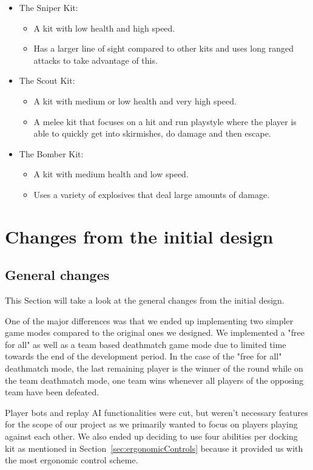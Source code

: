 \begin{itemize}
    \item The Sniper Kit:
    \begin{itemize}
        \item A kit with low health and high speed. 
        \item Has a larger line of sight compared to other kits and uses long ranged attacks to take advantage of this. 
    \end{itemize}
    
    \item The Scout Kit:
    \begin{itemize}
        \item A kit with medium or low health and very high speed. 
        \item A melee kit that focuses on a hit and run playstyle where the player is able to quickly get into skirmishes, do damage and then escape. 
    \end{itemize}
    
    \item The Bomber Kit:
    \begin{itemize}
        \item A kit with medium health and low speed.
        \item Uses a variety of explosives that deal large amounts of damage.
    \end{itemize}
\end{itemize}

\section{Changes from the initial design}
\subsection{General changes}
This Section will take a look at the general changes from the initial design. 

One of the major differences was that we ended up implementing two simpler game modes compared to the original ones we designed. We implemented a "free for all" as well as a team based deathmatch game mode due to limited time towards the end of the development period. In the case of the "free for all" deathmatch mode, the last remaining player is the winner of the round while on the team deathmatch mode, one team wins whenever all players of the opposing team have been defeated. 

Player bots and replay AI functionalities were cut, but weren't necessary features for the scope of our project as we primarily wanted to focus on players playing against each other. We also ended up deciding to use four abilities per docking kit as mentioned in Section~\ref{sec:ergonomicControls} because it provided us with the most ergonomic control scheme.
    
